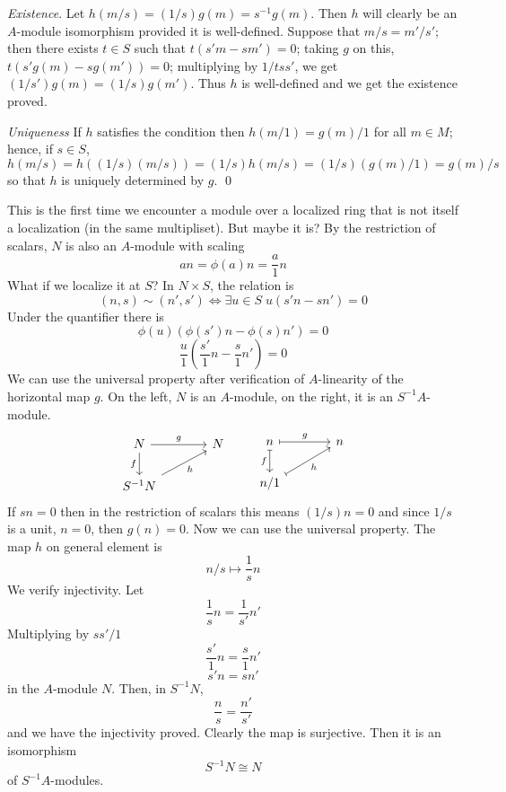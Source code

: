 \documentclass{article}
\begin{document}
\textit{Existence}. Let $h(m/s) = (1/s)g(m) = s^{-1}g(m)$. Then $h$ will clearly be an $A$-module isomorphism provided it is well-defined. Suppose that $m/s = m'/s'$; then there exists $t \in S$ such that $t(s'm - sm') = 0$; taking $g$ on this, $t(s'g(m) - sg(m')) = 0$; multiplying by $1/tss'$, we get $(1/s')g(m) = (1/s)g(m')$. Thus $h$ is well-defined and we get the existence proved.

\textit{Uniqueness} If $h$ satisfies the condition then $h(m/1) = g(m)/1$ for all $m \in M$; hence, if $s \in S$, $h(m/s) = h((1/s)(m/s)) = (1/s)h(m/s) = (1/s)(g(m)/1) = g(m)/s$ so that $h$ is uniquely determined by $g$.
\qed

\vspace{8mm}

This is the first time we encounter a module over a localized ring that is not itself a localization (in the same multipliset). But maybe it is? 
By the restriction of scalars, $N$ is also an $A$-module with scaling
\[
an = \phi(a)n = \frac{a}{1}n
\]
What if we localize it at $S$? In $N \times S$, the relation is 
\[
(n, s) \sim (n', s') \iff \exists u \in S \; u(s'n - sn') = 0
\]
Under the quantifier there is
\[
\phi(u)(\phi(s')n - \phi(s)n') = 0 
\]
\[
\frac{u}{1}(\frac{s'}{1}n - \frac{s}{1}n') = 0
\]
We can use the universal property after verification of $A$-linearity of the horizontal map $g$. On the left, $N$ is an $A$-module, on the right, it is an $S^{-1}A$-module.
\[
\begin{tikzcd}[column sep=large]
N \arrow{r}{g} \arrow{d}[swap]{f} & N \\
S^{-1}N \arrow{ur}[swap]{h}
\end{tikzcd}
%
\qquad
%
\begin{tikzcd}[column sep=large]
n \arrow[d, mapsto, swap, "f"] \arrow[r, mapsto, "g"] & n \\
n/1\arrow[ur, mapsto, swap, "h"] 
\end{tikzcd}
\]
If $sn = 0$ then in the restriction of scalars this means $(1/s)n = 0$ and since $1/s$ is a unit, $n = 0$, then $g(n) = 0$. Now we can use the universal property. The map $h$ on general element is
\[
n/s \mapsto \frac{1}{s}n
\]
We verify injectivity. Let
\[
\frac{1}{s}n = \frac{1}{s'}n'
\]
Multiplying by $ss'/1$
\[
\frac{s'}{1}n = \frac{s}{1}n'
\]
\[
s'n = sn'
\]
in the $A$-module $N$. Then, in $S^{-1}N$,
\[
\frac{n}{s} = \frac{n'}{s'}
\]
and we have the injectivity proved. Clearly the map is surjective. Then it is an isomorphism
\[
S^{-1}N \cong N
\]
of $S^{-1}A$-modules. 
\end{document}
